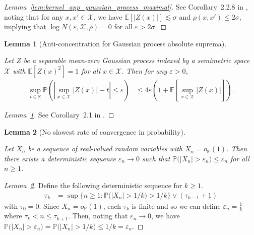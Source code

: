 \documentclass[11pt,lof]{puthesis}
\renewcommand{\P}{\ensuremath{\mathbb{P}}}
\newcommand{\R}{\ensuremath{\mathbb{R}}}
\newcommand{\E}{\ensuremath{\mathbb{E}}}
\newcommand{\cX}{\ensuremath{\mathcal{X}}}
\theoremstyle{break}
\newtheorem{lemma}{Lemma}[section]
\theoremstyle{proof}
\newtheorem{proof}{Proof}
\begin{document}
\begin{proof}[Lemma~\ref{lem:kernel_app_gaussian_process_maximal}]

  See Corollary~2.2.8 in \citet{van1996weak},
  noting that for any $x,x' \in \cX$, we have
  $\E[|Z(x)|] \lesssim \sigma$ and
  $\rho(x,x') \leq 2\sigma$,
  implying that
  $\log N(\varepsilon, \cX, \rho) = 0$
  for all
  $\varepsilon > 2 \sigma$.
\end{proof}

\begin{lemma}[Anti-concentration for Gaussian process absolute suprema]
  \label{lem:kernel_app_anticoncentration}

  Let $Z$ be a separable mean-zero Gaussian process
  indexed by a semimetric space $\cX$ with
  $\E[Z(x)^2] = 1$
  for all $x \in \cX$.
  Then for any $\varepsilon > 0$,
  \begin{align*}
    \sup_{t \in \R}
    \P\left(
      \left|
        \sup_{x \in \cX}
        \big| Z(x) \big|
        - t
      \right|
      \leq \varepsilon
    \right)
    &\leq
    4 \varepsilon
    \left(
      1 + \E\left[
        \sup_{x \in \cX}
        \big| Z(x) \big|
      \right]
    \right).
  \end{align*}

\end{lemma}

\begin{proof}[Lemma~\ref{lem:kernel_app_anticoncentration}]

  See Corollary~2.1
  in \citet{chernozhukov2014anti}.
\end{proof}

\begin{lemma}[No slowest rate of convergence in probability]
  \label{lem:kernel_app_slow_convergence}

  Let $X_n$ be a sequence of real-valued random
  variables with
  $X_n = o_\P(1)$.
  Then there exists a deterministic sequence
  $\varepsilon_n \to 0$
  such that
  $\P\big(|X_n| > \varepsilon_n\big) \leq \varepsilon_n$
  for all $n \geq 1$.

\end{lemma}

\begin{proof}[Lemma~\ref{lem:kernel_app_slow_convergence}]

  Define the following deterministic sequence
  for $k \geq 1$.
  \begin{align*}
    \tau_k
    &=
    \sup
    \big\{
      n \geq 1:
      \P\big(|X_n| > 1/k\big)
      > 1/k
    \big\}
    \vee
    (\tau_{k-1} +1)
  \end{align*}
  with $\tau_0 = 0$.
  Since $X_n = o_\P(1)$,
  each $\tau_k$ is finite
  and so we can define
  $\varepsilon_n = \frac{1}{k}$
  where $\tau_k < n \leq \tau_{k+1}$.
  Then, noting that $\varepsilon_n \to 0$,
  we have
  $\P\big(|X_n| > \varepsilon_n\big)
  = \P\big(|X_n| > 1/k\big) \leq 1/k = \varepsilon_n$.
\end{proof}
\end{document}
